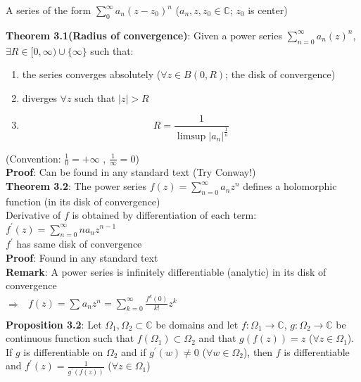 \documentclass{article}
\begin{document}
\begin{flushleft}
A series of the form $\sum_{0}^{\infty} a_n(z-z_0)^n$ ($a_n,z,z_0\in \mathds{C}$; $z_0$ is center)

\textbf{Theorem 3.1(Radius of convergence)}: Given a power series $\sum_{n=0}^{\infty} a_n(z)^n$,\\
$\exists R\in [0,\infty) \cup \{\infty\}$ such that:
\begin{enumerate}
\item the series converges absolutely ($\forall z\in B(0,R)$; the disk of convergence)
\item diverges $\forall z$ such that $|z|>R$ 
\item \begin{equation} R=\frac{1}{\limsup |a_n|^{\frac{1}{n}}}\nonumber \end{equation}
\end{enumerate}
(Convention: $\frac{1}{0}=+\infty$ , $\frac{1}{\infty}=0$)\\
\textbf{Proof}: Can be found in any standard text (Try Conway!)\\
\vspace{2mm}
\textbf{Theorem 3.2}: The power series $f(z)=\sum_{n=0}^{\infty} a_nz^n$ defines a holomorphic function (in its disk of convergence)\\
Derivative of $f$ is obtained by differentiation of each term:\\
$f^{'}(z)=\sum_{n=0}^{\infty} na_nz^{n-1}$ \\
$f^{'}$ has same disk of convergence\\
\textbf{Proof}: Found in any standard text\\
\textbf{Remark}: A power series is infinitely differentiable (analytic) in its disk of convergence\\  
$\Rightarrow$ \hspace{40mm}$ \begin{aligned} f(z)=\sum_{}^{}a_nz^n =\sum_{k=0}^{\infty} \frac{f^{k}(0)}{k!} z^k \nonumber\\ \end{aligned}$
\\
\vspace{3mm}
\textbf{Proposition 3.2}: Let $\Omega_1,\Omega_2 \subset \mathds{C}$ be domains and let $f:\Omega_1\rightarrow \mathds{C}$,
$g:\Omega_2\rightarrow \mathds{C}$ be continuous function such that $f(\Omega_1)\subset \Omega_2$ and that $g(f(z))=z$ ($\forall z\in \Omega_1$).
If $g$ is differentiable on $\Omega_2$ and if $g^{'}(w)\neq 0$ ($\forall w \in \Omega_2$), then $f$ is differentiable and $f^{'}(z)=\frac{1}{g^{'}(f(z))}$ ($\forall z\in \Omega_1$)


\end{flushleft}
\end{document}
